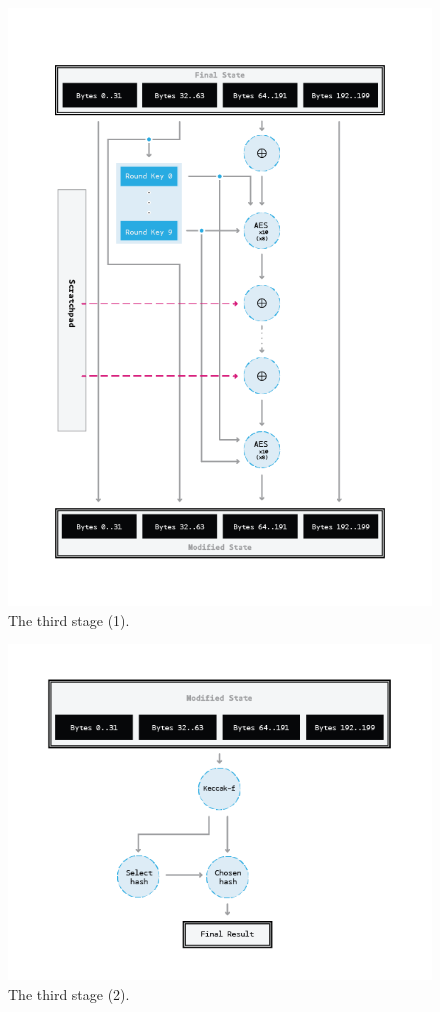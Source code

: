 \begin{figure}[H]
  \centering
  \includegraphics[scale=0.62, natwidth=210mm, natheight=297mm]{Images/Bill/stage_3.1.png}
  \caption{The third stage (1).~\cite{bill}}
  \label{fig:stage3.1}
\end{figure}
\clearpage

\begin{figure}[H]
  \centering
  \includegraphics[scale=0.62, natwidth=210mm, natheight=148mm]{Images/Bill/stage_3.2_modified.png}
  \caption{The third stage (2).~\cite{bill}}
  \label{fig:stage3.2}
\end{figure}

